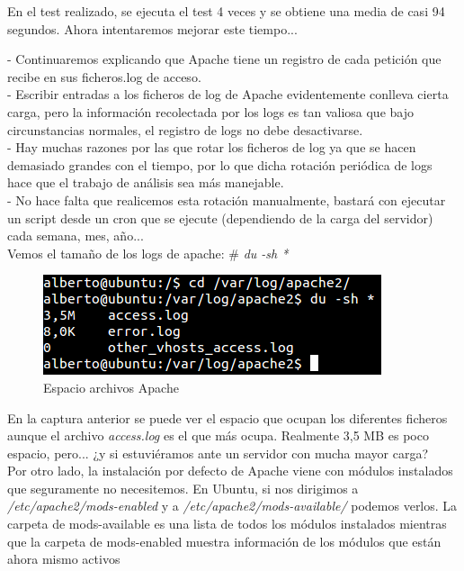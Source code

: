 En el test realizado, se ejecuta el test 4 veces y se obtiene una media de casi 94 segundos. Ahora intentaremos mejorar este tiempo...

\newpage
- Continuaremos explicando que Apache tiene un registro de cada petición que recibe en sus ficheros.log de acceso. \\ 
- Escribir entradas a los ficheros de log de Apache evidentemente conlleva cierta carga, pero la información recolectada por los logs es tan valiosa que bajo circunstancias normales, el registro de logs no debe desactivarse.\\
- Hay muchas razones por las que rotar los ficheros de log ya que se hacen demasiado grandes con el tiempo, por lo que dicha rotación periódica de logs hace que el trabajo de análisis sea más manejable.  \\
- No hace falta que realicemos esta rotación manualmente, bastará con ejecutar un script desde un cron que se ejecute (dependiendo de la carga del servidor) cada semana, mes, año... \\

Vemos el tamaño de los logs de apache:
\# \textit{du -sh *} \\

\begin{figure}[h]
	\centering
	\includegraphics[scale=0.55]{images/espacio.png}
	\caption{Espacio archivos Apache}
\end{figure} 

En la captura anterior se puede ver el espacio que ocupan los diferentes ficheros aunque el archivo \textit{access.log} es el que más ocupa. Realmente 3,5 MB es poco espacio, pero... ¿y si estuviéramos ante un servidor con mucha mayor carga? \\







Por otro lado, la instalación por defecto de Apache viene con módulos instalados que seguramente no necesitemos. En Ubuntu, si nos dirigimos a \textit{/etc/apache2/mods-enabled} y a \textit{/etc/apache2/mods-available/} podemos verlos. La carpeta de mods-available es una lista de todos los módulos instalados mientras que la carpeta de mods-enabled muestra información de los módulos que están ahora mismo activos

